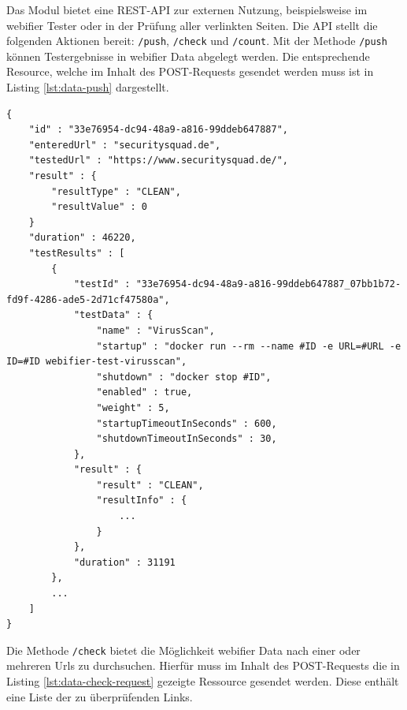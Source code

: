 Das Modul bietet eine \ac{REST}-\ac{API} zur externen Nutzung, beispielsweise im webifier Tester oder in der Prüfung aller verlinkten Seiten. Die API stellt die folgenden Aktionen bereit: \lstinline[style=eclipse]{/push}, \lstinline[style=eclipse]{/check} und \lstinline[style=eclipse]{/count}. Mit der Methode \lstinline[style=eclipse]{/push} können Testergebnisse in webifier Data abgelegt werden. Die entsprechende Resource, welche im Inhalt des POST-Requests gesendet werden muss ist in Listing \ref{lst:data-push} dargestellt.

\begin{scriptsize}
\begin{lstlisting}
{
    "id" : "33e76954-dc94-48a9-a816-99ddeb647887",
    "enteredUrl" : "securitysquad.de",
    "testedUrl" : "https://www.securitysquad.de/",
    "result" : {
        "resultType" : "CLEAN",
        "resultValue" : 0
    }
    "duration" : 46220,
    "testResults" : [
        {
            "testId" : "33e76954-dc94-48a9-a816-99ddeb647887_07bb1b72-fd9f-4286-ade5-2d71cf47580a",
            "testData" : {
                "name" : "VirusScan",
                "startup" : "docker run --rm --name #ID -e URL=#URL -e ID=#ID webifier-test-virusscan",
                "shutdown" : "docker stop #ID",
                "enabled" : true,
                "weight" : 5,
                "startupTimeoutInSeconds" : 600,
                "shutdownTimeoutInSeconds" : 30,
            },
            "result" : {
                "result" : "CLEAN",
                "resultInfo" : {
                    ...
                }
            },
            "duration" : 31191
        },
        ...
    ]
}
\end{lstlisting}
\end{scriptsize}

Die Methode \lstinline[style=eclipse]{/check} bietet die Möglichkeit webifier Data nach einer oder mehreren Urls zu durchsuchen. Hierfür muss im Inhalt des POST-Requests die in Listing \ref{lst:data-check-request} gezeigte Ressource gesendet werden. Diese enthält eine Liste der zu überprüfenden Links.

